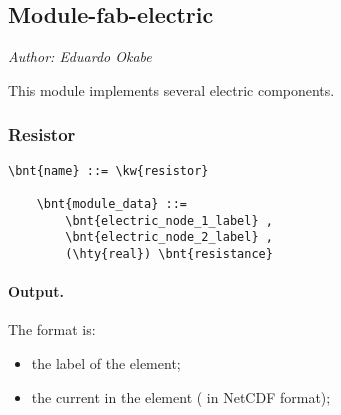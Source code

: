 % 
% 
% 
% 
% 
% 
% 
% 
% 


\subsection{Module-fab-electric}
\label{sec:MODULE:FAB-ELECTRIC}
\emph{Author: Eduardo Okabe}

\noindent
This module implements several electric components.

\subsubsection{Resistor}
\label{sec:MODULE:FAB-ELECTRIC:RESISTOR}
\begin{Verbatim}[commandchars=\\\{\}]
    \bnt{name} ::= \kw{resistor}

    \bnt{module_data} ::=
        \bnt{electric_node_1_label} ,
        \bnt{electric_node_2_label} ,
        (\hty{real}) \bnt{resistance}
\end{Verbatim}

\paragraph{Output.}
\label{sec:MODULE:FAB-ELECTRIC:RESISTOR:OUTPUT}
The format is:
\begin{itemize}
\item the label of the element;
\item the current in the element ( in NetCDF format);
\end{itemize}

